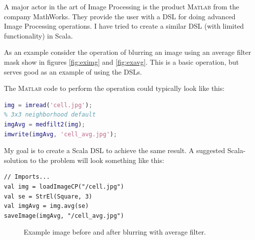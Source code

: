 \documentclass[a4paper,english]{report}
\newcommand{\matlab}{\textsc{Matlab}\textregistered}
\begin{document}
A major actor in the art of Image Processing is the product \matlab
from the company MathWorks\texttrademark. They provide the user with a
DSL for doing advanced Image Processing operations. I have tried to
create a similar DSL (with limited functionality) in Scala.

As an example consider the operation of blurring an image using an
average filter mask show in figures \vref{fig:eximg} and
\vref{fig:exavg}. This is a basic operation, but serves good as an
example of using the DSLs.

The \matlab{} code to perform the operation could
typically look like this:
\begin{lstlisting}[language=matlab]
img = imread('cell.jpg');
% 3x3 neighborhood default
imgAvg = medfilt2(img);
imwrite(imgAvg, 'cell_avg.jpg');
\end{lstlisting}

My goal is to create a Scala DSL to achieve the same result. A
suggested Scala-solution to the problem will look something like this:

\begin{lstlisting}
// Imports...
val img = loadImageCP("/cell.jpg")
val se = StrEl(Square, 3)
val imgAvg = img.avg(se)
saveImage(imgAvg, "/cell_avg.jpg")
\end{lstlisting}

\begin{figure}
  \hfill
  \caption{Example image before and after blurring with average
    filter.\label{fig:eximg}}
\end{figure}
\end{document}
